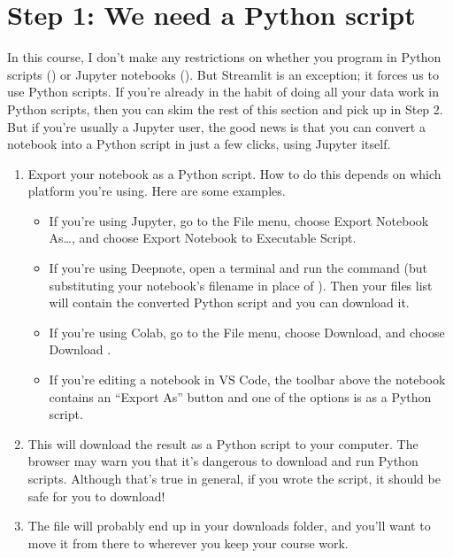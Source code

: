 \documentclass[letterpaper,10pt,english]{jupyterBook}
\begin{document}
\section{Step 1: We need a Python script}
\label{\detokenize{chapter-14-dashboards:step-1-we-need-a-python-script}}
\sphinxAtStartPar
In this course, I don’t make any restrictions on whether you program in Python scripts () or Jupyter notebooks ().  But Streamlit is an exception; it forces us to use Python scripts.  If you’re already in the habit of doing all your data work in Python scripts, then you can skim the rest of this section and pick up in Step 2.  But if you’re usually a Jupyter user, the good news is that you can convert a notebook into a Python script in just a few clicks, using Jupyter itself.
\begin{enumerate}
%
\item {} 
\sphinxAtStartPar
Export your notebook as a Python script.  How to do this depends on which platform you’re using.  Here are some examples.
\begin{itemize}
\item {} 
\sphinxAtStartPar
If you’re using Jupyter, go to the File menu, choose Export Notebook As…, and choose Export Notebook to Executable Script.

\item {} 
\sphinxAtStartPar
If you’re using Deepnote, open a terminal and run the command  (but substituting your notebook’s filename in place of ).  Then your files list will contain the converted Python script and you can download it.

\item {} 
\sphinxAtStartPar
If you’re using Colab, go to the File menu, choose Download, and choose Download .

\item {} 
\sphinxAtStartPar
If you’re editing a notebook in VS Code, the toolbar above the notebook contains an “Export As” button and one of the options is as a Python script.

\end{itemize}

\item {} 
\sphinxAtStartPar
This will download the result as a Python script to your computer.  The browser may warn you that it’s dangerous to download and run Python scripts.  Although that’s true in general, if you wrote the script, it should be safe for you to download!

\item {} 
\sphinxAtStartPar
The file will probably end up in your downloads folder, and you’ll want to move it from there to wherever you keep your course work.

\end{enumerate}
\end{document}
